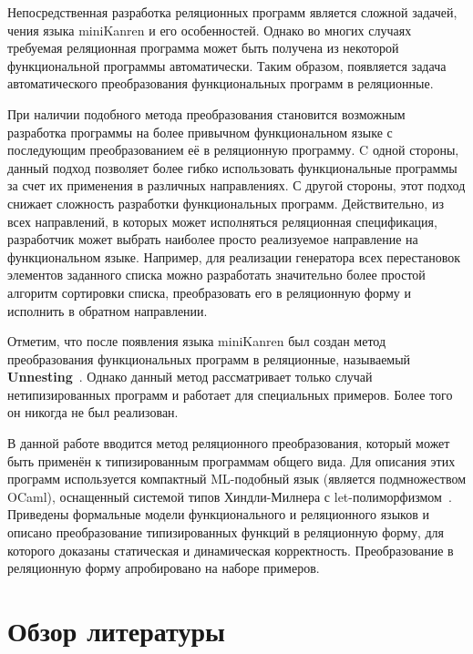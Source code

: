 Непосредственная разработка реляционных программ является сложной задачей,
чения языка miniKanren и его особенностей. Однако во многих случаях требуемая реляционная программа может быть получена из некоторой функциональной программы автоматически. Таким образом, появляется задача автоматического преобразования функциональных программ в реляционные.

При наличии подобного метода преобразования становится возможным разработка программы на более привычном функциональном языке с последующим преобразованием её в реляционную программу. C одной стороны, данный подход позволяет более гибко использовать функциональные программы за счет их применения в различных направлениях. С другой стороны, этот подход снижает сложность разработки функциональных программ. Действительно, из всех направлений, в которых может исполняться реляционная спецификация, разработчик может выбрать наиболее просто реализуемое направление на функциональном языке. Например, для реализации генератора всех перестановок элементов заданного списка можно разработать значительно более простой алгоритм сортировки списка, преобразовать его в реляционную форму и исполнить в обратном направлении.

Отметим, что после появления языка miniKanren был создан метод преобразования функциональных программ в реляционные, называемый \textbf{Unnesting}~\cite{lozov-spbu:miniKanren}. Однако данный метод рассматривает только случай нетипизированных программ и работает для специальных примеров. Более того он никогда не был реализован.

В данной работе вводится метод реляционного преобразования, который может быть применён к типизированным программам общего вида. Для описания этих программ используется компактный ML-подобный язык (является подмножеством OCaml), оснащенный системой типов Хиндли-Милнера с let-полиморфизмом~\cite{lozov-spbu:poly}. Приведены формальные модели функционального и реляционного языков и описано преобразование типизированных функций в реляционную форму, для которого доказаны статическая и динамическая корректность. Преобразование в реляционную форму апробировано на наборе примеров.

\section{Обзор литературы}

